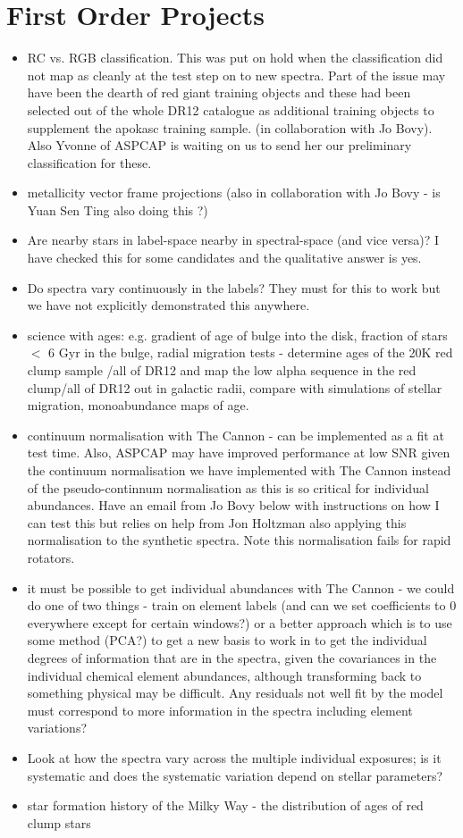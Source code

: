 \documentclass[11pt]{amsart}
\begin{document}
\section{First Order Projects}
\begin{itemize}
\item RC vs. RGB classification.
This was put on hold when the classification did not map as cleanly at the test step on to new spectra. Part of the issue may have been the dearth of red giant training objects and these had been selected out of the whole DR12 catalogue as additional training objects to supplement the apokasc training sample. (in collaboration with Jo Bovy). Also Yvonne of ASPCAP is waiting on us to send her our preliminary classification for these. 
\item metallicity vector frame projections (also in collaboration with Jo Bovy - is Yuan Sen Ting also doing this ?)
\item Are nearby stars in label-space nearby in spectral-space (and vice versa)?
I have checked this for some candidates and the qualitative answer is yes. 
\item Do spectra vary continuously in the labels?
They must for this to work but we have not explicitly demonstrated this anywhere.
\item science with ages: e.g. gradient of age of bulge into the disk, fraction of stars $<$ 6 Gyr in the bulge, radial migration tests - determine ages of the 20K red clump sample /all of DR12 and map the low alpha sequence in the red clump/all of DR12 out in galactic radii, compare with simulations of stellar migration, monoabundance maps of age. 
\item continuum normalisation with The Cannon - can be implemented as a fit at test time. Also, ASPCAP may have improved performance at low SNR given the continuum normalisation we have implemented with The Cannon instead of the pseudo-continnum normalisation as this is so critical for individual abundances. Have an email from Jo Bovy below with instructions on how I can test this but relies on help from Jon Holtzman also applying this normalisation to the synthetic spectra. Note this normalisation fails for rapid rotators. \\
\item it must be possible to get individual abundances with The Cannon - we could do one of two things - train on element labels  (and can we set coefficients  to 0 everywhere except for certain windows?) or a better approach which is to use some method (PCA?) to get a new basis to work in to get the individual degrees of information that are in the spectra, given the covariances in the individual chemical element abundances, although transforming back to something physical may be difficult. Any residuals not well fit by the model must correspond to more information in the spectra including element variations? 
\item Look at how the spectra vary across the multiple individual exposures; is it systematic and does the systematic variation depend on stellar parameters?
\item star formation history of the Milky Way - the distribution of ages of red clump stars 




\end{itemize}
\end{document}
